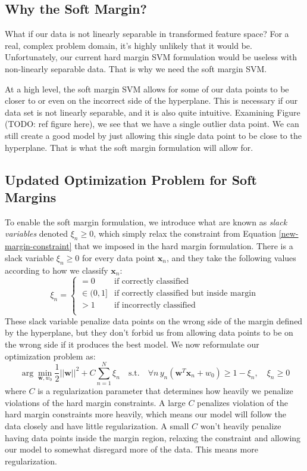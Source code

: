 \subsection{Why the Soft Margin?}
What if our data is not linearly separable in transformed feature space? For a real, complex problem domain, it's highly unlikely that it would be. Unfortunately, our current hard margin SVM formulation would be useless with non-linearly separable data. That is why we need the soft margin SVM.

At a high level, the soft margin SVM allows for some of our data points to be closer to or even on the incorrect side of the hyperplane. This is necessary if our data set is not linearly separable, and it is also quite intuitive. Examining Figure (TODO: ref figure here), we see that we have a single outlier data point. We can still create a good model by just allowing this single data point to be close to the hyperplane. That is what the soft margin formulation will allow for.

\subsection{Updated Optimization Problem for Soft Margins}
To enable the soft margin formulation, we introduce what are known as \textit{slack variables} denoted $\xi_{n} \geq 0$, which simply relax the constraint from Equation \ref{new-margin-constraint} that we imposed in the hard margin formulation. There is a slack variable $\xi_{n} \geq 0$ for every data point $\textbf{x}_{n}$, and they take the following values according to how we classify $\textbf{x}_{n}$:
\begin{equation} \label{slack-variable-values}
	\xi_{n} = \begin{cases}
	 	= 0 & \text{if correctly classified} \\
		\in (0, 1] & \text{if correctly classified but inside margin} \\
		> 1 & \text{if incorrectly classified} \\
	\end{cases}
\end{equation}
These slack variable penalize data points on the wrong side of the margin defined by the hyperplane, but they don't forbid us from allowing data points to be on the wrong side if it produces the best model. We now reformulate our optimization problem as:
\begin{equation} \label{soft-margin-optimization-problem}
	\arg\min_{\textbf{w}, w_{0}} \frac{1}{2} ||\textbf{w}||^{2} + C \sum_{n=1}^{N} \xi_{n} \quad \text{s.t.} \quad \forall n \, y_{n}(\textbf{w}^{T}\textbf{x}_{n} + w_{0}) \geq 1 - \xi_{n}, \quad \xi_{n} \geq 0
\end{equation}
where $C$ is a regularization parameter that determines how heavily we penalize violations of the hard margin constraints. A large $C$ penalizes violation of the hard margin constraints more heavily, which means our model will follow the data closely and have little regularization. A small $C$ won't heavily penalize having data points inside the margin region, relaxing the constraint and allowing our model to somewhat disregard more of the data. This means more regularization.

